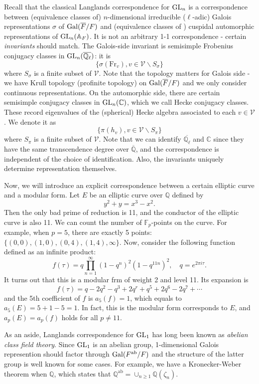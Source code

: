 Recall that the classical Langlands correspondence for $\operatorname{\mathrm{GL}}_{n}$ is a correspondence between (equivalence classes of)
$n$-dimensional irreducible ($\ell$-adic) Galois representations $\sigma$ of $\operatorname{\mathrm{Gal}}(\overline{F}/F)$
and (equivalence classes of ) cuspidal automorphic representations of $\operatorname{\mathrm{GL}}_{n}(\mathbb{A}_{F})$.
It is not an arbitrary 1-1 correspondence - certain \emph{invariants} should match.
The Galois-side invariant is semisimple Frobenius conjugacy classes in $\operatorname{\mathrm{GL}}_{n}(\overline{\mathbb{Q}_{\ell}})$: it is
$$
    \{\sigma(\mathrm{Fr}_v), v\in \mathscr{V}\backslash S_{\sigma}\}
$$
where $S_{\sigma}$ is a finite subset of $\mathscr{V}$.
Note that the topology matters for Galois side - we have Krull topology (profinite topology) on $\operatorname{\mathrm{Gal}}(\overline{F}/F)$
and we only consider continuous representations.
On the automorphic side, there are certain semisimple conjugacy classes in $\operatorname{\mathrm{GL}}_{n}(\mathbb{C})$, which we call
Hecke conjugacy classes.
These record eigenvalues of the (spherical) Hecke algebra associated to each $v\in \mathscr{V}$.
We denote it as
$$
    \{\pi(h_{v}),v\in \mathscr{V}\backslash S_{\pi}\}
$$
where $S_{\pi}$ is a finite subset of $\mathscr{V}$.
Note that we can identify $\overline{\mathbb{Q}_{\ell}}$ and $\mathbb{C}$ since they have
the same transcendence degree over $\overline{\mathbb{Q}}$, and the correspondence is independent of
the choice of identification.
Also, the invariants uniquely determine representation themselves.


Now, we will introduce an explicit correspondence between a certain elliptic curve and a modular form.
Let $E$ be an elliptic curve over $\mathbb{Q}$ defined by
$$
y^{2} + y = x^{3} - x^{2}.
$$
Then the only bad prime of reduction is 11, and the conductor of the elliptic curve is also 11.
We can count the number of $\mathbb{F}_{p}$-points on the curve.
For example, when $p = 5$, there are exactly 5 points: $\{(0, 0), (1, 0), (0, 4), (1, 4), \infty\}$.
Now, consider the following function defined as an infinite product:
$$
    f(\tau) = q\prod_{n=1}^{\infty} (1 - q^{n})^{2}(1-q^{11n})^{2}, \quad q = e^{2\pi i \tau}.
$$
It turns out that this is a modular frm of weight 2 and level 11. Its expansion is
$$
    f(\tau) = q - 2q^{2} - q^{3} + 2q^{r} + q^{5} + 2q^{6} - 2q^{7} + \cdots
$$
and the 5th coefficient of $f$ is $a_{5}(f) = 1$, which equals to $a_{5}(E) = 5 + 1 - 5 = 1$.
In fact, this is the modular form corresponds to $E$, and $a_{p}(E) = a_{p}(f)$ holds for all $p\neq 11$.

As an aside, Langlands correspondence for $\operatorname{\mathrm{GL}}_{1}$ has long been known as \emph{abelian class field theory}.
Since $\operatorname{\mathrm{GL}}_{1}$ is an abelian group, 1-dimensional Galois represention should factor through $\operatorname{\mathrm{Gal}}(F^{\mathrm{ab}}/F)$
and the structure of the latter group is well known for some cases.
For example, we have a Kronecker-Weber theorem when $\mathbb{Q}$, which states that $\mathbb{Q}^{\mathrm{ab}} = \cup_{n\geq 1}\mathbb{Q}(\zeta_{n})$.


